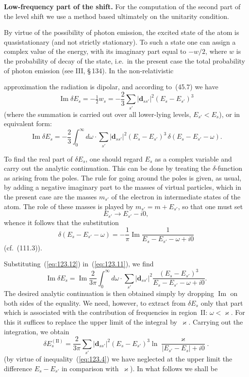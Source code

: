 \textbf{Low-frequency part of the shift.} For the computation of the second part of the level shift we use a method based ultimately on the unitarity condition.

By virtue of the possibility of photon emission, the excited state of the atom is quasistationary (and not strictly stationary). To such a state one can assign a complex value of the energy, with its imaginary part equal to $-w/2$, where $w$ is the probability of decay of the state, i.e.\ in the present case the total probability of photon emission (see III, \S\,134). In the non-relativistic


\noindent approximation the radiation is dipolar, and according to~(45.7) we have
\begin{equation}
\operatorname{Im}\delta E_s = -\tfrac{1}{2}w_s = -\frac{2}{3}\sum_{s'}|\mathbf{d}_{ss'}|^2(E_s - E_{s'})^3
\label{eq:123.11}
\end{equation}
(where the summation is carried out over all lower-lying levels, $E_{s'} < E_s$), or in equivalent form:
\[
\operatorname{Im}\delta E_s = -\frac{2}{3}\int_0^\infty d\omega\cdot\sum_{s'}|\mathbf{d}_{ss'}|^2(E_s - E_{s'})^3\,\delta(E_s - E_{s'} - \omega).
\]

To find the real part of $\delta E_s$, one should regard $E_s$ as a complex variable and carry out the analytic continuation. This can be done by treating the $\delta$-function as arising from the poles. The rule for going around the poles is given, as usual, by adding a negative imaginary part to the masses of virtual particles, which in the present case are the masses $m_{s'}$ of the electron in intermediate states of the atom. The role of these masses is played by $m_{s'} = m + E_{s'}$, so that one must set
\[
E_{s'} \to E_{s'} - i0,
\]
whence it follows that the substitution
\begin{equation}
\delta(E_s - E_{s'} - \omega) = -\frac{1}{\pi}\operatorname{Im}\frac{1}{E_s - E_{s'} - \omega + i0}
\label{eq:123.12}
\end{equation}
(cf.~(111.3)).

Substituting~(\ref{eq:123.12}) in~(\ref{eq:123.11}), we find
\[
\operatorname{Im}\delta E_s = \operatorname{Im}\frac{2}{3\pi}\int_0^\infty d\omega\cdot\sum_{s'}|\mathbf{d}_{ss'}|^2\frac{(E_s - E_{s'})^3}{E_s - E_{s'} - \omega + i0}.
\]
The desired analytic continuation is then obtained simply by dropping $\operatorname{Im}$ on both sides of the equality. We need, however, to extract from $\delta E_s$ only that part which is associated with the contribution of frequencies in region~II: $\omega < \varkappa$. For this it suffices to replace the upper limit of the integral by~$\varkappa$. Carrying out the integration, we obtain
\begin{equation}
\delta E_s^{(\mathrm{II})} = \frac{2}{3\pi}\sum_{s'}|\mathbf{d}_{ss'}|^2(E_s - E_{s'})^3\ln\frac{\varkappa}{|E_{s'} - E_s| + i0}.
\label{eq:123.13}
\end{equation}
(by virtue of inequality~(\ref{eq:123.4}) we have neglected at the upper limit the difference $E_s - E_{s'}$ in comparison with~$\varkappa$). In what follows we shall be

